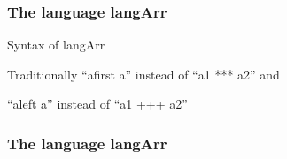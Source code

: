 \documentclass[svgnames,11pt]{beamer}
\begin{document}
\begin{frame}
\frametitle{ The language {{langArr}} }


\begin{block}{Syntax of {{langArr}} }
%

\end{block}

Traditionally ``{{afirst a}}'' instead of ``{{a1 *** a2}}'' and 

``{{aleft a}}'' instead of ``{{a1 +++ a2}}''

\end{frame}

\begin{frame}
\frametitle{ The language {{langArr}} }

%
%
%


\end{frame}
\end{document}
